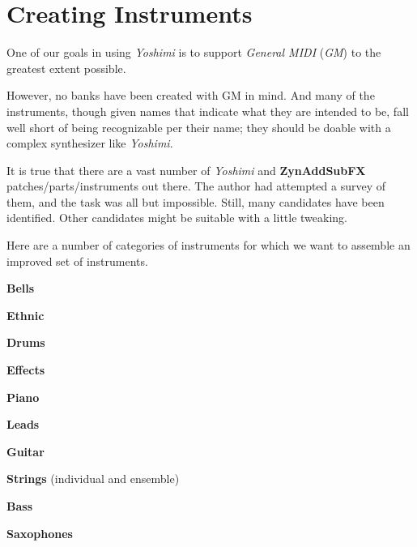 %
%
%

\section{Creating Instruments}
\label{sec:cookbook_instruments}

   One of our goals in using \textsl{Yoshimi} is to support
   \textsl{General MIDI} (\textsl{GM})
   to the greatest extent possible.

   However, no banks have been created with GM in mind.  And many of the
   instruments, though given names that indicate what they are intended to
   be, fall well short of being recognizable per their name; they should be
   doable with a complex synthesizer like \textsl{Yoshimi}.
  
   It is true that there are a vast number of \textsl{Yoshimi} and
   \textbf{ZynAddSubFX} patches/parts/instruments out there.  The author
   had attempted a survey of them, and the task was all but impossible.
   Still, many candidates have been identified.  Other candidates might be
   suitable with a little tweaking.

   Here are a number of categories of instruments for which we want to
   assemble an improved set of instruments.

   \begin{enumber}
      \item \textbf{Bells}
      \item \textbf{Ethnic}
      \item \textbf{Drums}
      \item \textbf{Effects}
      \item \textbf{Piano}
      \item \textbf{Leads}
      \item \textbf{Guitar}
      \item \textbf{Strings} (individual and ensemble)
      \item \textbf{Bass}
      \item \textbf{Saxophones}
   \end{enumber}

